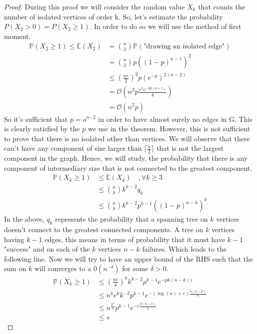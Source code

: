 \begin{proof}
During this proof we will consider the random value $X_k$ that counts the number of isolated vertices of order k.
So, let's estimate the probability $P(X_2 > 0) = P(X_2 \geq 1 )$. In order to do so we will use the method of first moment.
\begin{align}
	\mathbb{P}(X_2 \geq 1) \leq \mathbb{E}(X_2) 	&= \binom{n}{2}\mathbb{P}(\text{"drawing an isolated edge"}) \\
						    	&= \binom{n}{2}p((1-p)^{n-1})^2 \\
							&\leq (\frac{ne}{2})^2p(e^{-p})^{2(n-2)} \\
						    	&= \mathcal{O}\left(n^2p \frac{ e^2 e^{-2p(n+1)} }{4}\right) \\
							&= \mathcal{O}(n^2p)
\end{align}
So it's sufficient that $p = o^{n{-2}}$ in order to have almost surely no edges in G. This is clearly satisfied by the $p$ we use in the theorem.
\newline
However, this is not sufficient to prove that there is no isolated other than vertices. We will observe that there can't have any component of size larger than $\lceil \frac{n}{2} \rceil$ that is not the largest component in the graph.
Hence, we will study, the probability that there is any component of intermediary size that is not connected to the greatest component.
\begin{align}
	\mathbb{P}(X_k \geq 1) &\leq \mathbb{E}(X_k)\quad, \forall k \geq 3 \\
				&\leq \binom{n}{k} k^{k-2} q_k\\
				&\leq \binom{n}{k} k^{k-2} p^{k-1} ((1-p)^{n-k})^k
\end{align}
In the above, $q_k$ represents the probability that a spanning tree on $k$ vertices doesn't connect to the greatest connected components. A tree on $k$ vertices having $k-1$ edges, this means in terms of probability that it must have $k-1$ "success" and on each of the $k$ vertices $n-k$ failures. Which leads to the following line.
\newline 
Now we will try to have an upper bound of the RHS such that the sum on $k$ will converges to a $\mathcal{0}(n^{-\delta})$ for some $\delta >0$.
\begin{align}
	\mathbb{P}(X_k \geq 1) 	&\leq (\frac{ne}{k})^k k^{k-2} p^{k-1} e^{-pk(n-k))}\\
				&\leq n^ke^kk^{-2} p^{k-1}e^{-(\log(n) + c)\frac{k(n-k)}{n}}\\
				&\leq n^\frac{k^2}{n} p^{k-1}e^{-c\frac{k(n-k)}{n}}\\
				&\leq s
\end{align}

\end{proof}
